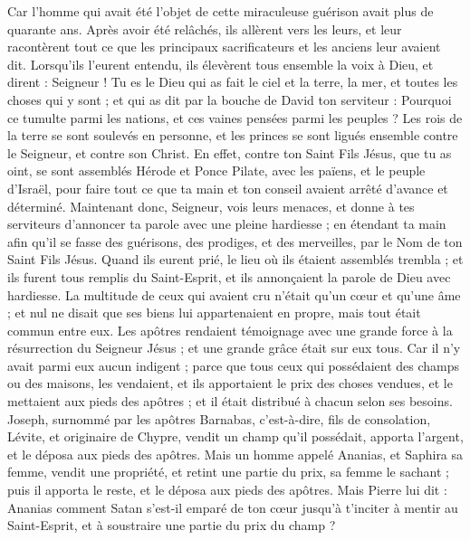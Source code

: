\begin{multicols}{2}
Car l'homme qui avait été l’objet de cette miraculeuse guérison avait plus de quarante ans.
Après avoir été relâchés, ils allèrent vers les leurs, et leur racontèrent tout ce que les principaux sacrificateurs et les anciens leur avaient dit.
Lorsqu’ils l’eurent entendu, ils élevèrent tous ensemble la voix à Dieu, et dirent : Seigneur ! Tu es le Dieu qui as fait le ciel et la terre, la mer, et toutes les choses qui y sont ;
et qui as dit par la bouche de David ton serviteur : Pourquoi ce tumulte parmi les nations, et ces vaines pensées parmi les peuples ?
Les rois de la terre se sont soulevés en personne, et les princes se sont ligués ensemble contre le Seigneur, et contre son Christ.
En effet, contre ton Saint Fils Jésus, que tu as oint, se sont assemblés Hérode et Ponce Pilate, avec les païens, et le peuple d'Israël,
pour faire tout ce que ta main et ton conseil avaient arrêté d’avance et déterminé.
Maintenant donc, Seigneur, vois leurs menaces, et donne à tes serviteurs d'annoncer ta parole avec une pleine hardiesse ;
en étendant ta main afin qu'il se fasse des guérisons, des prodiges, et des merveilles, par le Nom de ton Saint Fils Jésus.
Quand ils eurent prié, le lieu où ils étaient assemblés trembla ; et ils furent tous remplis du Saint-Esprit, et ils annonçaient la parole de Dieu avec hardiesse.
La multitude de ceux qui avaient cru n'était qu'un cœur et qu'une âme ; et nul ne disait que ses biens lui appartenaient en propre, mais tout était commun entre eux.
Les apôtres rendaient témoignage avec une grande force à la résurrection du Seigneur Jésus ; et une grande grâce était sur eux tous.
Car il n'y avait parmi eux aucun indigent ; parce que tous ceux qui possédaient des champs ou des maisons, les vendaient, et ils apportaient le prix des choses vendues,
et le mettaient aux pieds des apôtres ; et il était distribué à chacun selon ses besoins.
Joseph, surnommé par les apôtres Barnabas, c'est-à-dire, fils de consolation, Lévite, et originaire de Chypre,
vendit un champ qu’il possédait, apporta l’argent, et le déposa aux pieds des apôtres.
\VerseOne{}Mais un homme appelé Ananias, et Saphira sa femme, vendit une propriété,
et retint une partie du prix, sa femme le sachant ; puis il apporta le reste, et le déposa aux pieds des apôtres.
Mais Pierre lui dit : Ananias comment Satan s'est-il emparé de ton cœur jusqu’à t'inciter à mentir au Saint-Esprit, et à soustraire une partie du prix du champ ?

\end{multicols}
